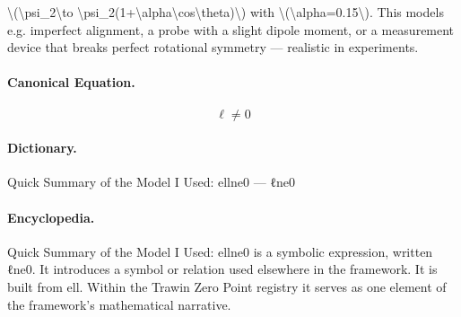 \textbackslash{}(\textbackslash{}psi\_2\textbackslash{}to \textbackslash{}psi\_2(1+\textbackslash{}alpha\textbackslash{}cos\textbackslash{}theta)\textbackslash{}) with \textbackslash{}(\textbackslash{}alpha=0.15\textbackslash{}). This models e.g. imperfect alignment, a probe with a slight dipole moment, or a measurement device that breaks perfect rotational symmetry — realistic in experiments.

\paragraph{Canonical Equation.}
\[
\ell\ne0
\]

\paragraph{Dictionary.}
Quick Summary of the Model I Used: ellne0 — ℓne0

\paragraph{Encyclopedia.}
Quick Summary of the Model I Used: ellne0 is a symbolic expression, written ℓne0. It introduces a symbol or relation used elsewhere in the framework. It is built from ell. Within the Trawin Zero Point registry it serves as one element of the framework's mathematical narrative.
